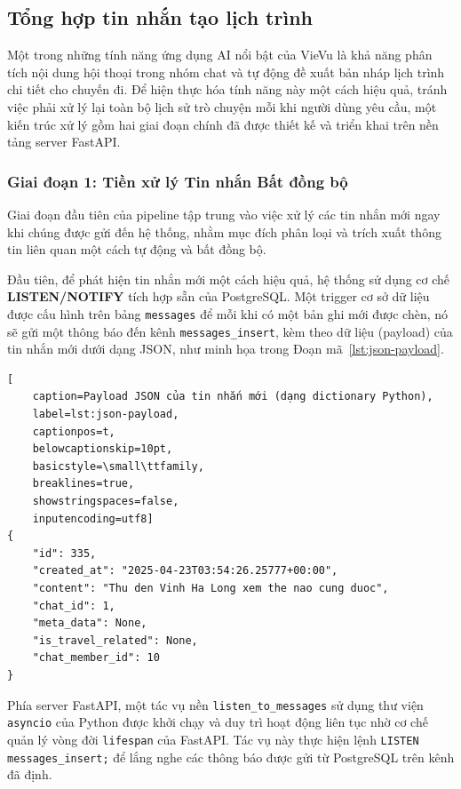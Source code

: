 
\subsection{Tổng hợp tin nhắn tạo lịch trình}
\label{subsec:summary_implementation_revised} %

Một trong những tính năng ứng dụng AI nổi bật của VieVu là khả năng phân tích nội dung hội thoại trong nhóm chat và tự động đề xuất bản nháp lịch trình chi tiết cho chuyến đi. Để hiện thực hóa tính năng này một cách hiệu quả, tránh việc phải xử lý lại toàn bộ lịch sử trò chuyện mỗi khi người dùng yêu cầu, một kiến trúc xử lý gồm hai giai đoạn chính đã được thiết kế và triển khai trên nền tảng server FastAPI.

\subsubsection{Giai đoạn 1: Tiền xử lý Tin nhắn Bất đồng bộ}
\label{subsubsec:summary_phase1_revised}

Giai đoạn đầu tiên của pipeline tập trung vào việc xử lý các tin nhắn mới ngay khi chúng được gửi đến hệ thống, nhằm mục đích phân loại và trích xuất thông tin liên quan một cách tự động và bất đồng bộ.

Đầu tiên, để phát hiện tin nhắn mới một cách hiệu quả, hệ thống sử dụng cơ chế \textbf{LISTEN/NOTIFY} tích hợp sẵn của PostgreSQL. Một trigger cơ sở dữ liệu được cấu hình trên bảng \texttt{messages} để mỗi khi có một bản ghi mới được chèn, nó sẽ gửi một thông báo đến kênh \texttt{messages\_insert}, kèm theo dữ liệu (payload) của tin nhắn mới dưới dạng JSON, như minh họa trong Đoạn mã~\ref{lst:json-payload}. %

\lstset{language=json}
\begin{lstlisting}[
    caption=Payload JSON của tin nhắn mới (dạng dictionary Python),
    label=lst:json-payload,
    captionpos=t,
    belowcaptionskip=10pt,
    basicstyle=\small\ttfamily,
    breaklines=true,
    showstringspaces=false,
    inputencoding=utf8]
{
    "id": 335,
    "created_at": "2025-04-23T03:54:26.25777+00:00",
    "content": "Thu den Vinh Ha Long xem the nao cung duoc",
    "chat_id": 1,
    "meta_data": None,
    "is_travel_related": None,
    "chat_member_id": 10
}
\end{lstlisting}

\noindent Phía server FastAPI, một tác vụ nền \texttt{listen\_to\_messages} sử dụng thư viện \texttt{asyncio} của Python được khởi chạy và duy trì hoạt động liên tục nhờ cơ chế quản lý vòng đời \texttt{lifespan} của FastAPI. Tác vụ này thực hiện lệnh \texttt{LISTEN messages\_insert;} để lắng nghe các thông báo được gửi từ PostgreSQL trên kênh đã định. %

